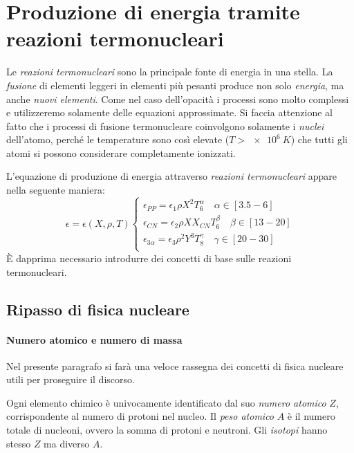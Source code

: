 \section[Reazioni Termonucleari]{Produzione di energia tramite reazioni termonucleari}\label{sec:reazioni-termonucleari}
Le \emph{reazioni termonucleari} sono la principale fonte di energia in una stella. La \emph{fusione} di elementi leggeri in elementi più pesanti produce non solo \emph{energia}, ma anche \emph{nuovi elementi}. Come nel caso dell'opacità i processi sono molto complessi e utilizzeremo solamente delle equazioni approssimate. Si faccia attenzione al fatto che i processi di fusione termonucleare coinvolgono solamente i \emph{nuclei} dell'atomo, perché le temperature sono così elevate ($T > \SI{e6}{K}$) che tutti gli atomi si possono considerare completamente ionizzati.

L'equazione di produzione di energia attraverso \emph{reazioni termonucleari} appare nella seguente maniera:
\begin{equation}\label{eq:reazioni-termonucleari}
    \epsilon = \epsilon(X, \rho, T) 
    \begin{cases} \epsilon_{PP} = \epsilon_1 \rho X^2 T_6^\alpha \quad \alpha \in [3.5 - 6] \\ 
    \epsilon_{CN} = \epsilon_2 \rho X X_{CN} T_6^\beta \quad \beta \in [13 - 20] \\ 
    \epsilon_{3\alpha} = \epsilon_3 \rho^2 Y^3 T_8^\gamma \quad \gamma \in [20 - 30] \\
    \end{cases}
\end{equation}
È dapprima necessario introdurre dei concetti di base sulle reazioni termonucleari.

\subsection{Ripasso di fisica nucleare}
\paragraph{Numero atomico e numero di massa}
Nel presente paragrafo si farà una veloce rassegna dei concetti di fisica nucleare utili per proseguire il discorso.

Ogni elemento chimico è univocamente identificato dal suo \emph{numero atomico} $Z$, corrispondente al numero di protoni nel nucleo. Il \emph{peso atomico} $A$ è il numero totale di nucleoni, ovvero la somma di protoni e neutroni. Gli \emph{isotopi} hanno stesso $Z$ ma diverso $A$.


